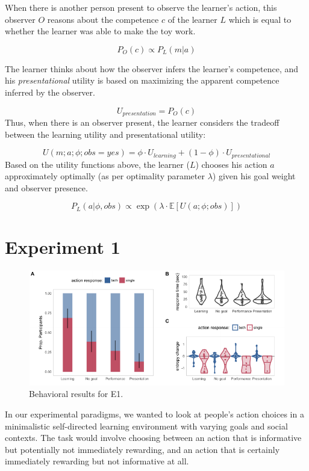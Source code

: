 \documentclass[10pt, letterpaper]{article}
\newenvironment{CodeChunk}{}{}
\begin{document}
When there is another person present to observe the learner's action,
this observer \(O\) reasons about the competence \(c\) of the learner
\(L\) which is equal to whether the learner was able to make the toy
work.

\[ P_O(c) \propto P_L(m | a)\]

The learner thinks about how the observer infers the learner's
competence, and his \emph{presentational} utility is based on maximizing
the apparent competence inferred by the observer.

\[ U_{presentation} = P_O(c) \] Thus, when there is an observer present,
the learner considers the tradeoff between the learning utility and
presentational utility:

\[ U(m;a;\phi; obs = yes) = \phi \cdot U_{learning} + (1-\phi) \cdot U_{presentational}\]
Based on the utility functions above, the learner (\(L\)) chooses his
action \(a\) approximately optimally (as per optimality parameter
\(\lambda\)) given his goal weight and observer presence.

\[ P_L(a | \phi, obs) \propto \exp(\lambda \cdot \mathbb{E}[U(a;\phi; obs)])\]

\section{Experiment 1}\label{experiment-1}

\begin{CodeChunk}
\begin{figure}[tb]

{\centering \includegraphics[width=0.95\linewidth]{figs/e1_behav_results-1} 

}

\caption[Behavioral results for E1]{Behavioral results for E1.}\label{fig:e1_behav_results}
\end{figure}
\end{CodeChunk}

In our experimental paradigms, we wanted to look at people's action
choices in a minimalistic self-directed learning environment with
varying goals and social contexts. The task would involve choosing
between an action that is informative but potentially not immediately
rewarding, and an action that is certainly immediately rewarding but not
informative at all.
\end{document}
